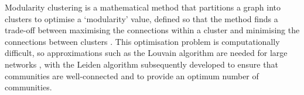 Modularity clustering is a mathematical method that partitions a graph into clusters to optimise a `modularity' value, defined so that the method finds a trade-off between maximising the connections within a cluster and minimising the connections between clusters \parencite{newmanModularityCommunityStructure2006}.
This optimisation problem is computationally difficult, so approximations such as the Louvain algorithm are needed for large networks \parencite{blondelFastUnfoldingCommunities2008}, with the Leiden algorithm \parencite{traagLouvainLeidenGuaranteeing2019} subsequently developed to ensure that communities are well-connected and to provide an optimum number of communities.

